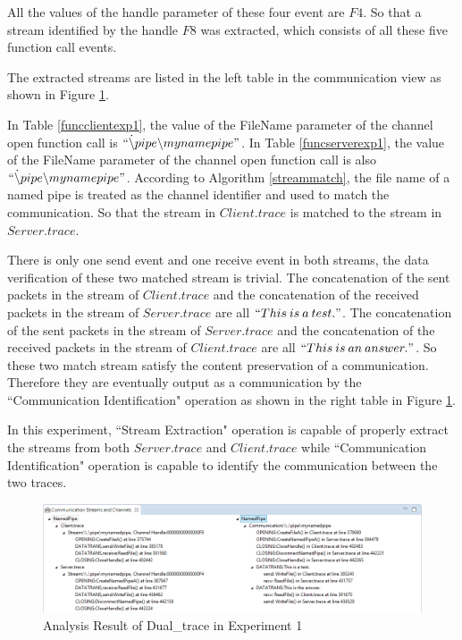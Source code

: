 All the values of the handle parameter of these four event are $F4$. So that a stream identified by the handle $F8$ was extracted, which consists of all these five function call events. 

The extracted streams are listed in the left table in the communication view as shown in Figure \ref{result1}.

In Table \ref{funcclientexp1}, the value of the FileName parameter of the channel open function call is $``\dot \backslash pipe \backslash mynamepipe"$. In Table \ref{funcserverexp1}, the value of the FileName parameter of the channel open function call is also $``\dot \backslash pipe \backslash mynamepipe"$. According to Algorithm \ref{streammatch}, the file name of a named pipe is treated as the channel identifier and used to match the communication. So that the stream in $Client.trace$ is matched to the stream in $Server.trace$.

There is only one send event and one receive event in both streams, the data verification of these two matched stream is trivial. The concatenation of the sent packets in the stream of $Client.trace$ and the concatenation of the received packets in the stream of $Server.trace$ are all $``This\: is\: a\: test."$. The concatenation of the sent packets in the stream of $Server.trace$ and the concatenation of the received packets in the stream of $Client.trace$ are all $``This\: is\: an\: answer."$. So these two match stream satisfy the content preservation of a communication. Therefore they are eventually output as a communication by the ``Communication Identification" operation as shown in the right table in Figure \ref{result1}.

In this experiment, ``Stream Extraction" operation is capable of properly extract the streams from both $Server.trace$ and $Client.trace$ while ``Communication Identification" operation is capable to identify the communication between the two traces.


\begin{figure}[H]
\centerline{\includegraphics[scale=0.65]{Figures/result1}}
 \caption{Analysis Result of Dual\_trace in Experiment 1}
\label{result1}
\end{figure}


